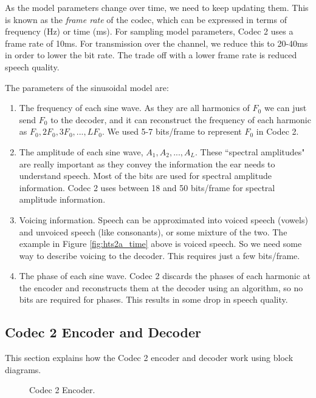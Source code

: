 \documentclass{article}
\begin{document}
{As the model parameters change over time, we need to keep updating them.  This is known as the \emph{frame rate} of the codec, which can be expressed in terms of frequency (Hz) or time (ms).  For sampling model parameters, Codec 2 uses a frame rate of 10ms.  For transmission over the channel, we reduce this to 20-40ms in order to lower the bit rate.  The trade off with a lower frame rate is reduced speech quality.

The parameters of the sinusoidal model are:
\begin{enumerate}
\item The frequency of each sine wave.  As they are all harmonics of $F_0$ we can just send $F_0$ to the decoder, and it can reconstruct the frequency of each harmonic as $F_0,2F_0,3F_0,...,LF_0$.  We used 5-7 bits/frame to represent $F_0$ in Codec 2.
\item The amplitude of each sine wave, $A_1,A_2,...,A_L$.  These ``spectral amplitudes" are really important as they convey the information the ear needs to understand speech.  Most of the bits are used for spectral amplitude information.  Codec 2 uses between 18 and 50 bits/frame for spectral amplitude information.
\item Voicing information.  Speech can be approximated into voiced speech (vowels) and unvoiced speech (like consonants), or some mixture of the two.  The example in Figure \ref{fig:hts2a_time} above is voiced speech.  So we need some way to describe voicing to the decoder. This requires just a few bits/frame.
\item The phase of each sine wave.  Codec 2 discards the phases of each harmonic at the encoder and reconstructs them at the decoder using an algorithm, so no bits are required for phases.  This results in some drop in speech quality.
\end{enumerate}

\subsection{Codec 2 Encoder and Decoder}

This section explains how the Codec 2 encoder and decoder work using block diagrams.

\begin{figure}[h]
\caption{Codec 2 Encoder.}
\label{fig:codec2_encoder}
\begin{center}
\begin{tikzpicture}[auto, node distance=2cm,>=triangle 45,x=1.0cm,y=1.0cm,align=center,text width=2cm]


\end{tikzpicture}
\end{center}
\end{figure}}
\end{document}
